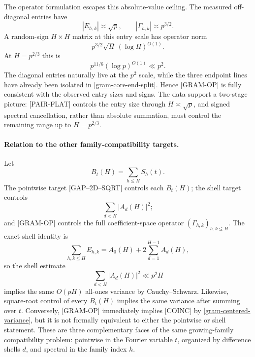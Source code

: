 \begin{remark}
The operator formulation escapes this absolute-value ceiling.  The
measured off-diagonal entries have
\[
 |E_{h,k}|\asymp\sqrt p,
 \qquad |\Gamma_{h,k}|\asymp p^{3/2}.
\]
A random-sign $H\times H$ matrix at this entry scale has operator norm
\[
 p^{3/2}\sqrt H\,(\log H)^{O(1)}.
\]
At $H=p^{2/3}$ this is
\[
 p^{11/6}(\log p)^{O(1)}\ll p^2.
\]
The diagonal entries naturally live at the $p^2$ scale, while the three
endpoint lines have already been isolated in
\eqref{gram-core-end-split}.  Hence \textup{[GRAM-OP]} is fully
consistent with the observed entry sizes and signs.  The data support a
two-stage picture: \textup{[PAIR-FLAT]} controls the entry size through
$H\asymp\sqrt p$, and signed spectral cancellation, rather than
absolute summation, must control the remaining range up to
$H=p^{2/3}$.
\end{remark}

\paragraph{Relation to the other family-compatibility targets.}
Let
\[
 B_t(H)=\sum_{h\le H}S_h(t).
\]
The pointwise target \textup{[GAP--2D--SQRT]} controls each $B_t(H)$;
the shell target controls
\[
 \sum_{d<H}|A_d(H)|^2;
\]
and \textup{[GRAM-OP]} controls the full coefficient-space operator
$(\Gamma_{h,k})_{h,k\le H}$.  The exact shell identity is
\[
 \sum_{h,k\le H}E_{h,k}
 =A_0(H)+2\sum_{d=1}^{H-1}A_d(H),
\]
so the shell estimate
\[
 \sum_{d<H}|A_d(H)|^2\ll p^2H
\]
implies the same $O(pH)$ all-ones variance by Cauchy--Schwarz.
Likewise, square-root control of every $B_t(H)$ implies the same variance
after summing over $t$.  Conversely, \textup{[GRAM-OP]} immediately
implies \textup{[COINC]} by
\eqref{gram-centered-variance}, but it is not formally equivalent to
either the pointwise or shell statement.  These are three complementary
faces of the same growing-family compatibility problem: pointwise in the
Fourier variable $t$, organized by difference shells $d$, and spectral
in the family index $h$.
